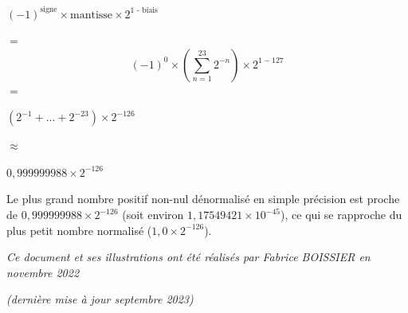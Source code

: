 \documentclass[11pt,a4paper]{article}
\begin{document}
\bigskip

\begin{center}
$ (-1)^{\text{signe}} \times \text{mantisse} \times 2^{\text{1 - biais}} $

\smallskip
$ = $
%
\[ (-1)^{\text{0}} \times ( \sum_{n=1}^{23} 2^{-n} ) \times 2^{1 - 127} \]
%
\smallskip
$ = $
\smallskip

$ (2^{-1} + ... + 2^{-23} ) \times 2^{-126} $

\smallskip
$ \approx $
\smallskip

$ 0,999999988 \times 2^{-126} $
\end{center}

Le plus grand nombre positif non-nul dénormalisé en simple précision est proche de $ 0,999999988 \times 2^{-126} $ (soit environ $ 1,175 494 21 \times 10^{-45} $), ce qui se rapproche du plus petit nombre normalisé ($ 1,0 \times 2^{-126} $).


\bigskip

\vfillFirst

\vfillLast

\begin{center}
\textit{Ce document et ses illustrations ont été réalisés par Fabrice BOISSIER en novembre 2022}

\textit{(dernière mise à jour septembre 2023)}
\end{center}
\end{document}
